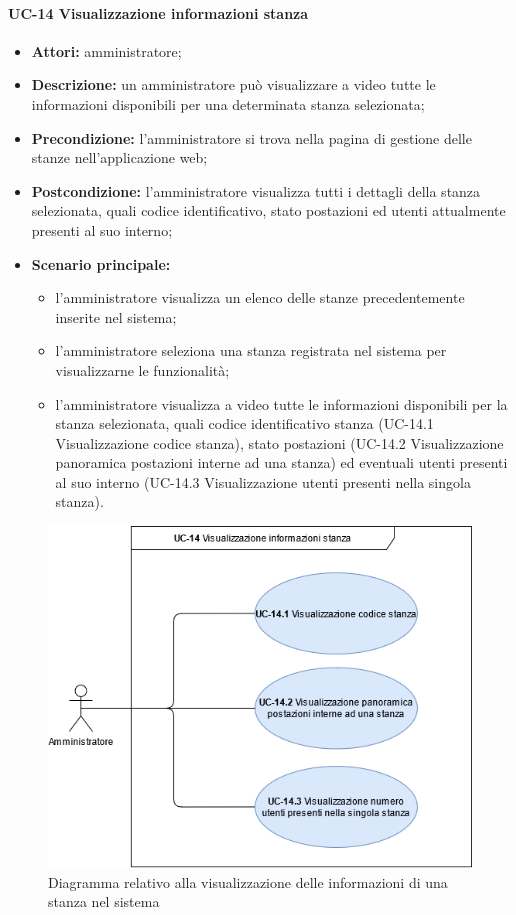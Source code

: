 \paragraph{UC-14 Visualizzazione informazioni stanza}
\begin{itemize}
    \item \textbf{Attori:} amministratore;
    \item \textbf{Descrizione:} un amministratore pu\`{o} visualizzare a video tutte le informazioni disponibili per una determinata stanza selezionata;
    \item \textbf{Precondizione:} l'amministratore si trova nella pagina di gestione delle stanze nell'applicazione web;
    \item \textbf{Postcondizione:} l'amministratore visualizza tutti i dettagli della stanza selezionata, quali codice identificativo, stato postazioni ed utenti attualmente presenti al suo interno;
    \item \textbf{Scenario principale:}
    \begin{itemize}
        \item l'amministratore visualizza un elenco delle stanze precedentemente inserite nel sistema;
        \item l'amministratore seleziona una stanza registrata nel sistema per visualizzarne le funzionalità;
        \item l'amministratore visualizza a video tutte le informazioni disponibili per la stanza selezionata, quali codice identificativo stanza (UC-14.1 Visualizzazione codice stanza), stato postazioni (UC-14.2 Visualizzazione panoramica postazioni interne ad una stanza) ed eventuali utenti presenti al suo interno (UC-14.3 Visualizzazione utenti presenti nella singola stanza).
    \end{itemize}
\end{itemize}

\begin{figure}[H]
    \centering
      \includegraphics[scale=0.50]{src/CasiDUso/immagini/InformazioniStanza.png}
    \caption{Diagramma relativo alla visualizzazione delle informazioni di una stanza nel sistema}
\end{figure}

